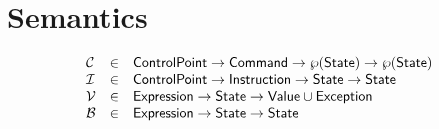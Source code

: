 
\newpage
\section{Semantics}
\[
\begin{array}{lcl}
  \mathcal{C} & \in & \mbox{\textsf{ControlPoint}} \rightarrow \mbox{\textsf{Command}} \rightarrow \wp(\mbox{\textsf{State}}) \rightarrow \wp(\mbox{\textsf{State}}) \\
  \mathcal{I} & \in & \mbox{\textsf{ControlPoint}} \rightarrow \mbox{\textsf{Instruction}} \rightarrow \mbox{\textsf{State}} \rightarrow \mbox{\textsf{State}} \\
  \mathcal{V} & \in & \mbox{\textsf{Expression}} \rightarrow \mbox{\textsf{State}} \rightarrow \mbox{\textsf{Value}} \cup \mbox{\textsf{Exception}}\\
  \mathcal{B} & \in & \mbox{\textsf{Expression}} \rightarrow \mbox{\textsf{State}} \rightarrow \mbox{\textsf{State}} \\
\end{array}
\]
